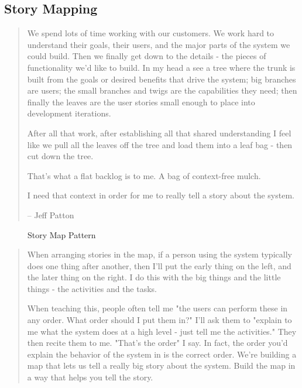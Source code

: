 \subsection{Story Mapping}
\blockquote{We spend lots of time working with our customers. We work hard to understand their goals, their users, and the major parts of the system we could build. Then we finally get down to the details - the pieces of functionality we'd like to build. In my head a see a tree where the trunk is built from the goals or desired benefits that drive the system; big branches are users; the small branches and twigs are the capabilities they need; then finally the leaves are the user stories small enough to place into development iterations.

After all that work, after establishing all that shared understanding I feel like we pull all the leaves off the tree and load them into a leaf bag - then cut down the tree.

That's what a flat backlog is to me. A bag of context-free mulch.

I need that context in order for me to really tell a story about the system.

-- Jeff Patton
}

\begin{figure}[H] %
\caption{Story Map Pattern}
\label{fig:re:storymap}
\end{figure}

\blockquote{When arranging stories in the map, if a person using the system typically does one thing after another, then I'll put the early thing on the left, and the later thing on the right. I do this with the big things and the little things - the activities and the tasks.

When teaching this, people often tell me "the users can perform these in any order. What order should I put them in?" I'll ask them to "explain to me what the system does at a high level - just tell me the activities." They then recite them to me. "That's the order" I say. In fact, the order you'd explain the behavior of the system in is the correct order. We're building a map that lets us tell a really big story about the system. Build the map in a way that helps you tell the story.}

